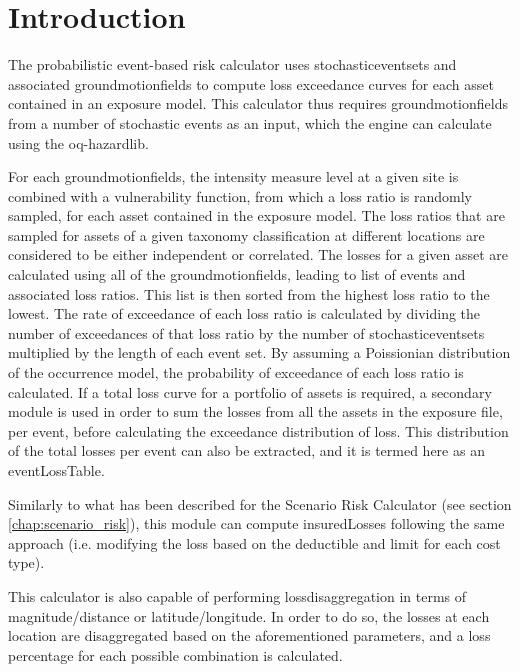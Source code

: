 \section{Introduction}
The probabilistic event-based risk calculator uses \glspl{stochasticeventset} and associated \glspl{groundmotionfield} to compute loss exceedance curves for each \gls{asset} contained in an \gls{exposure model}. This calculator thus requires \glspl{groundmotionfield} from a number of stochastic events as an input, which the engine can calculate using the oq-hazardlib.

For each \glspl{groundmotionfield}, the intensity measure level at a given site is combined with a \gls{vulnerability function}, from which a loss ratio is randomly sampled, for each \gls{asset} contained in the \gls{exposure model}. The loss ratios that are sampled for \glspl{asset} of a given \gls{taxonomy} classification at different locations are considered to be either independent or correlated. The losses for a given asset are calculated using all of the \glspl{groundmotionfield}, leading to list of events and associated loss ratios. This list is then sorted from the highest loss ratio to the lowest. The rate of exceedance of each loss ratio is calculated by dividing the number of exceedances of that loss ratio by the number of \glspl{stochasticeventset} multiplied by the length of each event set. By assuming a Poissionian distribution of the occurrence model, the probability of exceedance of each loss ratio is calculated. If a total loss curve for a portfolio of \glspl{asset} is required, a secondary module is used in order to sum the losses from all the \glspl{asset} in the exposure file, per event, before calculating the exceedance distribution of loss. This distribution of the total losses per event can also be extracted, and it is termed here as an \gls{eventLossTable}.

Similarly to what has been described for the Scenario Risk Calculator (see section \ref{chap:scenario_risk}), this module can compute \gls{insuredLosses} following the same approach (i.e. modifying the  loss based on the \gls{deductible} and \gls{limit} for each cost type).

This calculator is also capable of performing \gls{lossdisaggregation} in terms of magnitude/distance or latitude/longitude. In order to do so, the losses at each location are disaggregated based on the aforementioned parameters, and a loss percentage for each possible combination is calculated.

